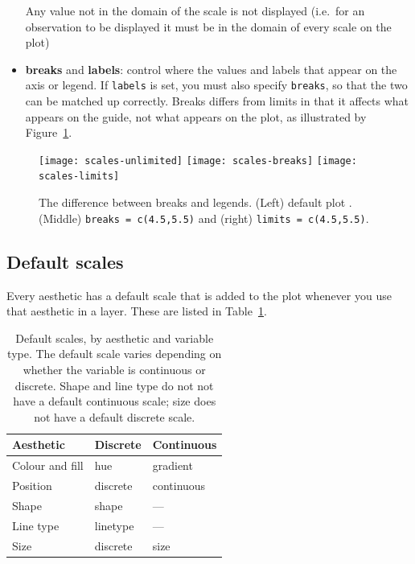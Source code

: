 \begin{itemize}
  Any value not in the domain of the scale is not displayed (i.e.\ for an observation to be displayed it must be in the domain of every scale on the plot)

  \item {\bf breaks} and {\bf labels}: control where the values and labels that appear on the axis or legend. If {\tt labels} is set, you must also specify {\tt breaks}, so that the two can be matched up correctly.  Breaks differs from limits in that it affects what appears on the guide, not what appears on the plot, as illustrated by Figure~\ref{fig:breaks_vs_legends}.
  
\end{itemize}

\begin{figure}[htbp]
  \centering
    \texttt{[image: scales-unlimited]}%
    \texttt{[image: scales-breaks]}%
    \texttt{[image: scales-limits]}
  \caption{The difference between breaks and legends.  (Left) default plot .  (Middle)  {\tt breaks = c(4.5,5.5)} and (right) {\tt limits = c(4.5,5.5)}.}
  \label{fig:breaks_vs_legends}
\end{figure}

\subsection{Default scales}
\label{sub:default_scales}

Every aesthetic has a default scale that is added to the plot whenever you use that aesthetic in a layer.  These are listed in Table~\ref{tbl:default-scales}.

\begin{table}
  \begin{center}
  \begin{tabular}{lll}
    \toprule
    Aesthetic & Discrete & Continuous \\
    \midrule
    Colour and fill & hue & gradient \\
    Position & discrete & continuous \\
    Shape & shape & --- \\
    Line type & linetype & --- \\
    Size & discrete  & size \\
    \bottomrule
  \end{tabular}
  \end{center}
  \caption{Default scales, by aesthetic and variable type.  The default scale varies depending on whether the variable is continuous or discrete.  Shape and line type do not not have a default continuous scale; size does not have a default discrete scale.}
  \label{tbl:default-scales}
\end{table}

